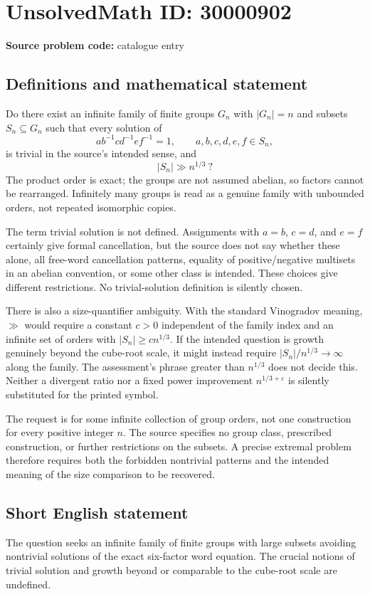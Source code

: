 \documentclass[11pt]{article}
\begin{document}
\section*{UnsolvedMath ID: 30000902}
\textbf{Source problem code:} catalogue entry
\subsection{Definitions and mathematical statement}
Do there exist an infinite family of finite groups $G_n$ with $|G_n|=n$ and subsets $S_n\subseteq G_n$ such that every solution of
\[
 ab^{-1}cd^{-1}ef^{-1}=1,
 \qquad a,b,c,d,e,f\in S_n,
\]
is trivial in the source's intended sense, and
\[
 |S_n|\gg n^{1/3}\ ?
\]
The product order is exact; the groups are not assumed abelian, so factors cannot be rearranged. Infinitely many groups is read as a genuine family with unbounded orders, not repeated isomorphic copies.

The term trivial solution is not defined. Assignments with $a=b$, $c=d$, and $e=f$ certainly give formal cancellation, but the source does not say whether these alone, all free-word cancellation patterns, equality of positive/negative multisets in an abelian convention, or some other class is intended. These choices give different restrictions. No trivial-solution definition is silently chosen.

There is also a size-quantifier ambiguity. With the standard Vinogradov meaning, $\gg$ would require a constant $c>0$ independent of the family index and an infinite set of orders with $|S_n|\ge c n^{1/3}$. If the intended question is growth genuinely beyond the cube-root scale, it might instead require $|S_n|/n^{1/3}\to\infty$ along the family. The assessment's phrase greater than $n^{1/3}$ does not decide this. Neither a divergent ratio nor a fixed power improvement $n^{1/3+\varepsilon}$ is silently substituted for the printed symbol.

The request is for some infinite collection of group orders, not one construction for every positive integer $n$. The source specifies no group class, prescribed construction, or further restrictions on the subsets. A precise extremal problem therefore requires both the forbidden nontrivial patterns and the intended meaning of the size comparison to be recovered.
\subsection{Short English statement}
The question seeks an infinite family of finite groups with large subsets avoiding nontrivial solutions of the exact six-factor word equation. The crucial notions of trivial solution and growth beyond or comparable to the cube-root scale are undefined.
\end{document}
